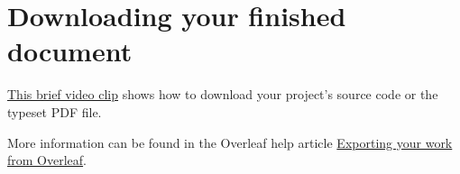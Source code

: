 \section{Downloading your finished document}

\href{https://videos.ctfassets.net/nrgyaltdicpt/2n6iw0AUELNtABCuva0oV5/cf27bff3a6099da94362d64645e69dfe/LL30download.mp4}{This brief video clip} shows how to download your project’s source code or the typeset PDF file.

More information can be found in the Overleaf help article \href{https://www.overleaf.com/learn/how-to/Exporting_your_work_from_Overleaf}{Exporting your work from Overleaf}.